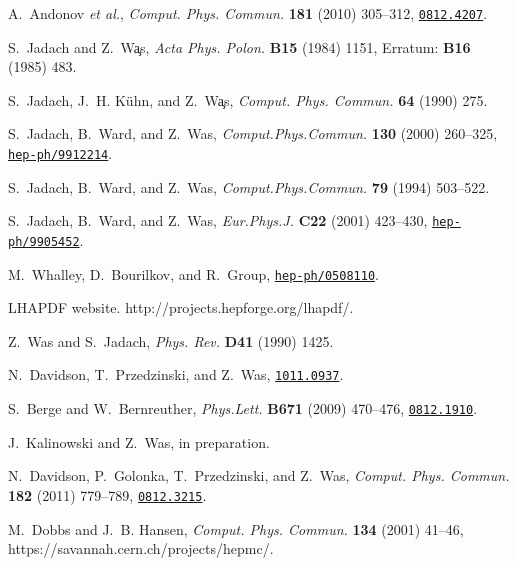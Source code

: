 \documentclass[12pt]{article}
\begin{document}
\begin{thebibliography}{10}
A.~Andonov {\em et al.}, {\em Comput. Phys. Commun.} {\bf 181} (2010) 305--312,
\href{http://www.arXiv.org/abs/0812.4207}{{\tt 0812.4207}}.

S.~Jadach and Z.~W\c{a}s, {\em Acta Phys. Polon.} {\bf B15} (1984) 1151,
  \uppercase{E}rratum: {\bf B16} (1985) 483.

S.~Jadach, J.~H. K\"{uhn}, and Z.~W\c{a}s, {\em Comput. Phys. Commun.} {\bf 64}
  (1990)
275.

S.~Jadach, B.~Ward, and Z.~Was, {\em Comput.Phys.Commun.} {\bf 130} (2000)
  260--325,
\href{http://www.arXiv.org/abs/hep-ph/9912214}{{\tt hep-ph/9912214}}.

S.~Jadach, B.~Ward, and Z.~Was, {\em Comput.Phys.Commun.} {\bf 79} (1994)
503--522.

S.~Jadach, B.~Ward, and Z.~Was, {\em Eur.Phys.J.} {\bf C22} (2001) 423--430,
\href{http://www.arXiv.org/abs/hep-ph/9905452}{{\tt hep-ph/9905452}}.

M.~Whalley, D.~Bourilkov, and R.~Group,
\href{http://www.arXiv.org/abs/hep-ph/0508110}{{\tt hep-ph/0508110}}.

{LHAPDF website}. {http://projects.hepforge.org/lhapdf/}.

Z.~Was and S.~Jadach, {\em Phys. Rev.} {\bf D41} (1990)
1425.

N.~Davidson, T.~Przedzinski, and Z.~Was,
\href{http://www.arXiv.org/abs/1011.0937}{{\tt 1011.0937}}.

S.~Berge and W.~Bernreuther, {\em Phys.Lett.} {\bf B671} (2009) 470--476,
\href{http://www.arXiv.org/abs/0812.1910}{{\tt 0812.1910}}.

J.~Kalinowski and Z.~Was, in preparation.

N.~Davidson, P.~Golonka, T.~Przedzinski, and Z.~Was, {\em Comput. Phys.
  Commun.} {\bf 182} (2011) 779--789,
\href{http://www.arXiv.org/abs/0812.3215}{{\tt 0812.3215}}.

M.~Dobbs and J.~B. Hansen, {\em Comput. Phys. Commun.} {\bf 134} (2001) 41--46,
https://savannah.cern.ch/projects/hepmc/.


\end{thebibliography}
\end{document}
